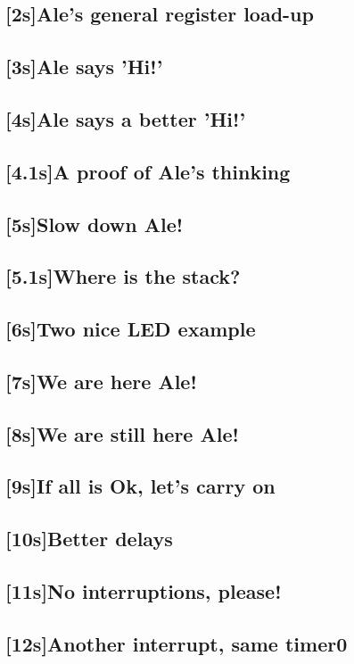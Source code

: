 \documentclass[12pt, a4paper]{book}
\begin{document}
\subsection{[2s]Ale's general register load-up}
\subsection{[3s]Ale says 'Hi!'}
\subsection{[4s]Ale says a better 'Hi!'}
\subsection{[4.1s]A proof of Ale's thinking}
\subsection{[5s]Slow down Ale!}
\subsection{[5.1s]Where is the stack?}
\subsection{[6s]Two nice LED example}
\subsection{[7s]We are here Ale!}
\subsection{[8s]We are still here Ale!}
\subsection{[9s]If all is Ok, let's carry on}
\subsection{[10s]Better delays}
\subsection{[11s]No interruptions, please!}
\subsection{[12s]Another interrupt, same timer0}
\end{document}
